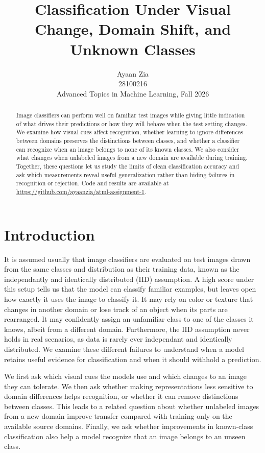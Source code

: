 \documentclass{article}
\title{Classification Under Visual Change, Domain Shift, and Unknown Classes}
\author{Ayaan Zia \\ 28100216 \\ Advanced Topics in Machine Learning, Fall 2026}
\begin{document}
\maketitle

\begin{abstract}
Image classifiers can perform well on familiar test images while giving little indication of what drives their predictions or how they will behave when the test setting changes. We examine how visual cues affect recognition, whether learning to ignore differences between domains preserves the distinctions between classes, and whether a classifier can recognize when an image belongs to none of its known classes. We also consider what changes when unlabeled images from a new domain are available during training. Together, these questions let us study the limits of clean classification accuracy and ask which measurements reveal useful generalization rather than hiding failures in recognition or rejection. Code and results are available at \url{https://github.com/ayaanzia/atml-assignment-1}.
\end{abstract}

\section{Introduction}
It is assumed usually that image classifiers are evaluated on test images drawn from the same classes and distribution as their training data, known as the independantly and identically distributed (IID) assumption. A high score under this setup tells us that the model can classify familiar examples, but leaves open how exactly it uses the image to classify it. It may rely on color or texture that changes in another domain or lose track of an object when its parts are rearranged. It may confidently assign an unfamiliar class to one of the classes it knows, albeit from a different domain. Furthermore, the IID assumption never holds in real scenarios, as data is rarely ever independant and identically distributed. We examine these different failures to understand when a model retains useful evidence for classification and when it should withhold a prediction.

We first ask which visual cues the models use and which changes to an image they can tolerate. We then ask whether making representations less sensitive to domain differences helps recognition, or whether it can remove distinctions between classes. This leads to a related question about whether unlabeled images from a new domain improve transfer compared with training only on the available source domains. Finally, we ask whether improvements in known-class classification also help a model recognize that an image belongs to an unseen class.
\end{document}
